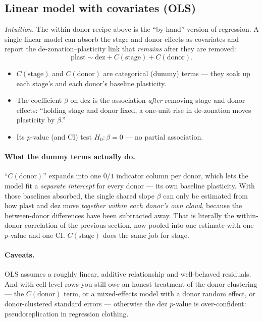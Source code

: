 \documentclass[11pt]{article}
\newcommand{\dez}{\text{dez}}
\newcommand{\plast}{\text{plast}}
\begin{document}
\subsection{Linear model with covariates (OLS)}

\textit{Intuition.} The within-donor recipe above is the ``by hand'' version of regression. A single linear model can absorb the stage and donor effects as covariates and report the de-zonation--plasticity link that \emph{remains} after they are removed:
\[
\plast \sim \dez + C(\text{stage}) + C(\text{donor}).
\]

\begin{itemize}[leftmargin=*]
  \item $C(\text{stage})$ and $C(\text{donor})$ are categorical (dummy) terms --- they soak up each stage's and each donor's baseline plasticity.
  \item The coefficient $\beta$ on $\dez$ is the association \emph{after} removing stage and donor effects: ``holding stage and donor fixed, a one-unit rise in de-zonation moves plasticity by $\beta$.''
  \item Its $p$-value (and CI) test $H_0:\beta = 0$ --- no partial association.
\end{itemize}

\paragraph{What the dummy terms actually do.} ``$C(\text{donor})$'' expands into one $0/1$ indicator column per donor, which lets the model fit a \emph{separate intercept} for every donor --- its own baseline plasticity. With those baselines absorbed, the single shared slope $\beta$ can only be estimated from how $\plast$ and $\dez$ move \emph{together within each donor's own cloud}, because the between-donor differences have been subtracted away. That is literally the within-donor correlation of the previous section, now pooled into one estimate with one $p$-value and one CI. $C(\text{stage})$ does the same job for stage.

\paragraph{Caveats.} OLS assumes a roughly linear, additive relationship and well-behaved residuals. And with cell-level rows you still owe an honest treatment of the donor clustering --- the $C(\text{donor})$ term, or a mixed-effects model with a donor random effect, or donor-clustered standard errors --- otherwise the $\dez$ $p$-value is over-confident: pseudoreplication in regression clothing.
\end{document}
